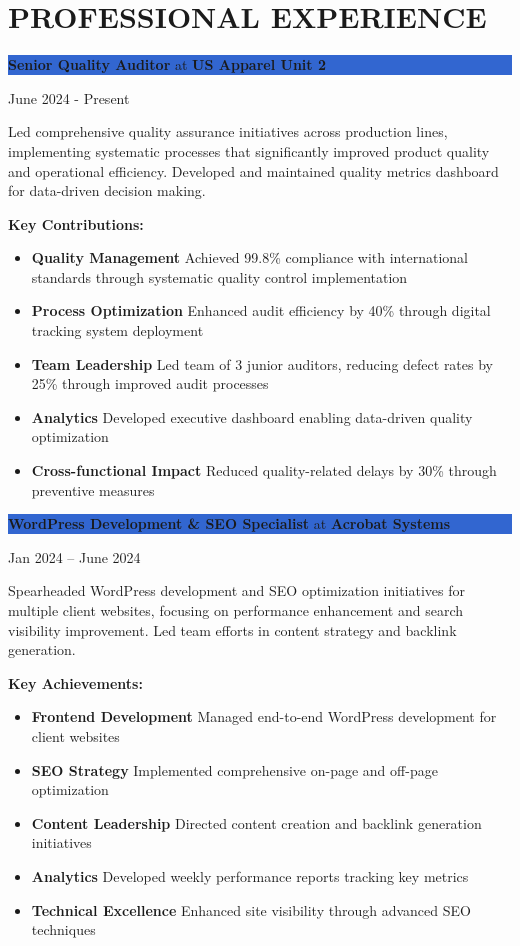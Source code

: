 \documentclass[11pt,a4paper]{article}
\newcommand{\role}[2]{%
    \colorbox{highlight}{%
        \parbox{\dimexpr\textwidth-2\fboxsep\relax}{%
            \vspace{0.2cm}\hspace{0.3cm}%
            {\large\textbf{\textcolor{primary}{#1}}} \textcolor{secondary}{at} {\large\textbf{\textcolor{primary}{#2}}}%
            \vspace{0.2cm}%
        }%
    }%
}
\newcommand{\daterange}[1]{{\color{secondary}\hfill#1}}
\newcommand{\achievement}[2]{\textbf{\textcolor{primary}{#1}} #2}
\begin{document}
\section*{PROFESSIONAL EXPERIENCE}

\role{Senior Quality Auditor}{US Apparel Unit 2} \daterange{June 2024 - Present}
\vspace{0.2cm}

Led comprehensive quality assurance initiatives across production lines, implementing systematic processes that significantly improved product quality and operational efficiency. Developed and maintained quality metrics dashboard for data-driven decision making.

\vspace{0.3cm}
\textbf{\textcolor{primary}{Key Contributions:}}
\begin{itemize}[leftmargin=*,nosep,itemsep=7pt,label=\textcolor{accent}{$\rightarrow$}]
\item \achievement{Quality Management}{Achieved 99.8\% compliance with international standards through systematic quality control implementation}
\item \achievement{Process Optimization}{Enhanced audit efficiency by 40\% through digital tracking system deployment}
\item \achievement{Team Leadership}{Led team of 3 junior auditors, reducing defect rates by 25\% through improved audit processes}
\item \achievement{Analytics}{Developed executive dashboard enabling data-driven quality optimization}
\item \achievement{Cross-functional Impact}{Reduced quality-related delays by 30\% through preventive measures}
\end{itemize}

\vspace{0.4cm}
\role{WordPress Development \& SEO Specialist}{Acrobat Systems} \daterange{Jan 2024 – June 2024}
\vspace{0.2cm}

Spearheaded WordPress development and SEO optimization initiatives for multiple client websites, focusing on performance enhancement and search visibility improvement. Led team efforts in content strategy and backlink generation.

\vspace{0.3cm}
\textbf{\textcolor{primary}{Key Achievements:}}
\begin{itemize}[leftmargin=*,nosep,itemsep=5pt]
\item \achievement{Frontend Development}{Managed end-to-end WordPress development for client websites}
\item \achievement{SEO Strategy}{Implemented comprehensive on-page and off-page optimization}
\item \achievement{Content Leadership}{Directed content creation and backlink generation initiatives}
\item \achievement{Analytics}{Developed weekly performance reports tracking key metrics}
\item \achievement{Technical Excellence}{Enhanced site visibility through advanced SEO techniques}
\end{itemize}
\end{document}
